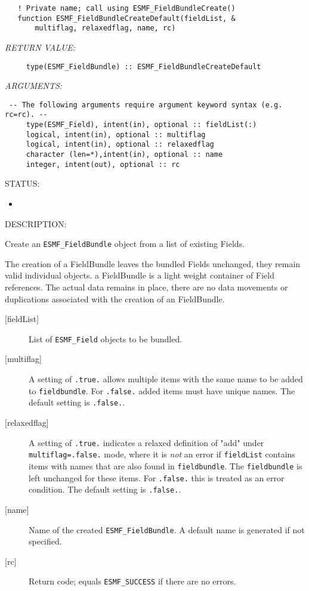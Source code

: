   
\begin{verbatim}   ! Private name; call using ESMF_FieldBundleCreate()
   function ESMF_FieldBundleCreateDefault(fieldList, &
       multiflag, relaxedflag, name, rc)\end{verbatim}{\em RETURN VALUE:}
\begin{verbatim}     type(ESMF_FieldBundle) :: ESMF_FieldBundleCreateDefault\end{verbatim}{\em ARGUMENTS:}
\begin{verbatim} -- The following arguments require argument keyword syntax (e.g. rc=rc). --
     type(ESMF_Field), intent(in), optional :: fieldList(:)
     logical, intent(in), optional :: multiflag
     logical, intent(in), optional :: relaxedflag
     character (len=*),intent(in), optional :: name
     integer, intent(out), optional :: rc\end{verbatim}
{\sf STATUS:}
   \begin{itemize}
   \item{}
   \end{itemize}
  
{\sf DESCRIPTION:\\ }


   Create an {\tt ESMF\_FieldBundle} object from a list of existing Fields.
  
   The creation of a FieldBundle leaves the bundled Fields unchanged, they
   remain valid individual objects. a FieldBundle is a light weight container
   of Field references. The actual data remains in place, there are no
   data movements or duplications associated with the creation of an
   FieldBundle.
  
   \begin{description}
   \item [{[fieldList]}]
   List of {\tt ESMF\_Field} objects to be bundled.
   \item [{[multiflag]}]
   A setting of {\tt .true.} allows multiple items with the same name
   to be added to {\tt fieldbundle}. For {\tt .false.} added items must
   have unique names. The default setting is {\tt .false.}.
   \item [{[relaxedflag]}]
   A setting of {\tt .true.} indicates a relaxed definition of "add"
   under {\tt multiflag=.false.} mode, where it is {\em not} an error if
   {\tt fieldList} contains items with names that are also found in
   {\tt fieldbundle}. The {\tt fieldbundle} is left unchanged for these items.
   For {\tt .false.} this is treated as an error condition.
   The default setting is {\tt .false.}.
   \item [{[name]}]
   Name of the created {\tt ESMF\_FieldBundle}. A default name is generated
   if not specified.
   \item [{[rc]}]
   Return code; equals {\tt ESMF\_SUCCESS} if there are no errors.
   \end{description}
   
